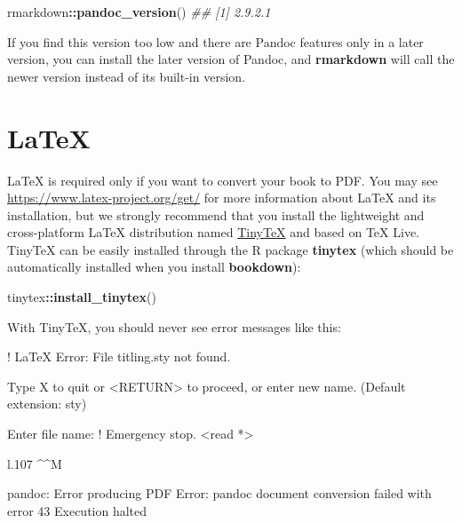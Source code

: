 \documentclass[
  12pt,
]{book}
\newenvironment{Shaded}{\begin{snugshade}}{\end{snugshade}}
\newcommand{\CommentTok}[1]{\textcolor[rgb]{0.56,0.35,0.01}{\textit{#1}}}
\newcommand{\KeywordTok}[1]{\textcolor[rgb]{0.13,0.29,0.53}{\textbf{#1}}}
\newcommand{\NormalTok}[1]{#1}
\newcommand{\OperatorTok}[1]{\textcolor[rgb]{0.81,0.36,0.00}{\textbf{#1}}}
\begin{document}
\begin{Shaded}
\begin{Highlighting}[]
\NormalTok{rmarkdown}\OperatorTok{::}\KeywordTok{pandoc\_version}\NormalTok{()}
\CommentTok{\#\# [1] \textquotesingle{}2.9.2.1\textquotesingle{}}
\end{Highlighting}
\end{Shaded}

If you find this version too low and there are Pandoc features only in a later version, you can install the later version of Pandoc, and \textbf{rmarkdown} will call the newer version instead of its built-in version.

\hypertarget{latex}{%
\section{LaTeX}\label{latex}}

LaTeX is required only if you want to convert your book to PDF. You may see \url{https://www.latex-project.org/get/} for more information about LaTeX and its installation, but we strongly recommend that you install the lightweight and cross-platform LaTeX distribution named \href{https://yihui.org/tinytex/}{TinyTeX} and based on TeX Live. TinyTeX can be easily installed through the R package \textbf{tinytex} (which should be automatically installed when you install \textbf{bookdown}):

\begin{Shaded}
\begin{Highlighting}[]
\NormalTok{tinytex}\OperatorTok{::}\KeywordTok{install\_tinytex}\NormalTok{()}
\end{Highlighting}
\end{Shaded}

With TinyTeX, you should never see error messages like this:

\begin{Shaded}
\begin{Highlighting}[]
\NormalTok{! LaTeX Error: File \textasciigrave{}titling.sty\textquotesingle{} not found.}

\NormalTok{Type X to quit or \textless{}RETURN\textgreater{} to proceed,}
\NormalTok{or enter new name. (Default extension: sty)}

\NormalTok{Enter file name:}
\NormalTok{! Emergency stop.}
\NormalTok{\textless{}read *\textgreater{}}

\NormalTok{l.107 \^{}\^{}M}

\NormalTok{pandoc: Error producing PDF}
\NormalTok{Error: pandoc document conversion failed with error 43}
\NormalTok{Execution halted}
\end{Highlighting}
\end{Shaded}
\end{document}
